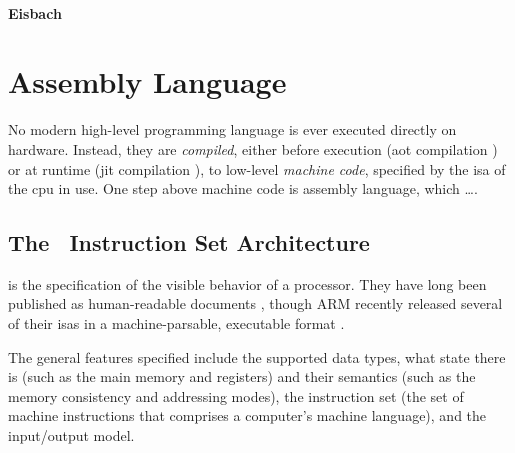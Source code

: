 \paragraph{Eisbach}


%
%

\section{Assembly Language}\label{se:assembly_language}
No modern high-level programming language is ever executed directly on hardware.
Instead, they are \emph{compiled},%
either before execution (\ac{aot} compilation \autocite{})%
or at runtime (\ac{jit} compilation \autocite{}),
to low-level \emph{machine code}, specified by the \ac{isa} of the \ac{cpu} in use.
One step above machine code is assembly language,
which \todo\dots.

\subsection{The \arch\ Instruction Set Architecture}
 is the specification of the visible behavior of a processor.
They have long been published as human-readable documents
\autocite{bowen1985cards,intel2019manual},
though ARM recently released several of their \acp{isa} in a machine-parsable,
executable format \autocite{reid2016arm}.




The general features specified include the supported data types,
what state there is (such as the main memory and registers)
and their semantics (such as the memory consistency and addressing modes), the instruction set (the set of machine instructions that comprises a computer's machine language), and the input/output model. 






